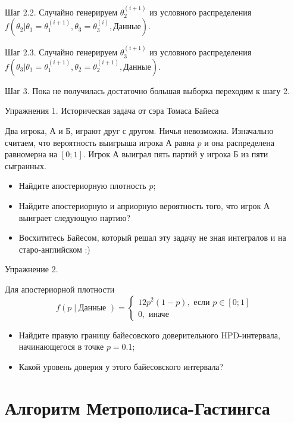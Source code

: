 \documentclass[11pt,russian,]{article}
\providecommand{\tightlist}{%
  \setlength{\itemsep}{0pt}\setlength{\parskip}{0pt}}
\begin{document}
Шаг 2.2. Случайно генерируем \(\theta_2^{(i+1)}\) из условного
распределения
\(f(\theta_2|\theta_1 = \theta_1^{(i+1)}, \theta_3 = \theta_3^{(i)}, \text{Данные})\).

Шаг 2.3. Случайно генерируем \(\theta_3^{(i+1)}\) из условного
распределения
\(f(\theta_3|\theta_1 = \theta_1^{(i+1)}, \theta_2 = \theta_2^{(i+1)}, \text{Данные})\).

Шаг 3. Пока не получилась достаточно большая выборка переходим к шагу 2.

Упражнения 1. Историческая задача от сэра Томаса Байеса

Два игрока, А и Б, играют друг с другом. Ничья невозможна. Изначально
считаем, что вероятность выигрыша игрока А равна \(p\) и она
распределена равномерна на \([0;1]\). Игрок А выиграл пять партий у
игрока Б из пяти сыгранных.

\begin{itemize}
\tightlist
\item
  Найдите апостериорную плотность \(p\);
\item
  Найдите апостериорную и априорную вероятность того, что игрок А
  выиграет следующую партию?
\item
  Восхититесь Байесом, который решал эту задачу не зная интегралов и на
  старо-английском :)
\end{itemize}

Упражнение 2.

Для апостериорной плотности \[
f(p \mid \text{Данные }) =
\begin{cases}
12p^2 (1-p), \text{ если } p \in [0;1] \\
0, \text{ иначе}
\end{cases}
\]

\begin{itemize}
\tightlist
\item
  Найдите правую границу байесовского доверительного HPD-интервала,
  начинающегося в точке \(p=0.1\);
\item
  Какой уровень доверия у этого байесовского интервала?
\end{itemize}

\section{Алгоритм Метрополиса-Гастингса}\label{--}
\end{document}

